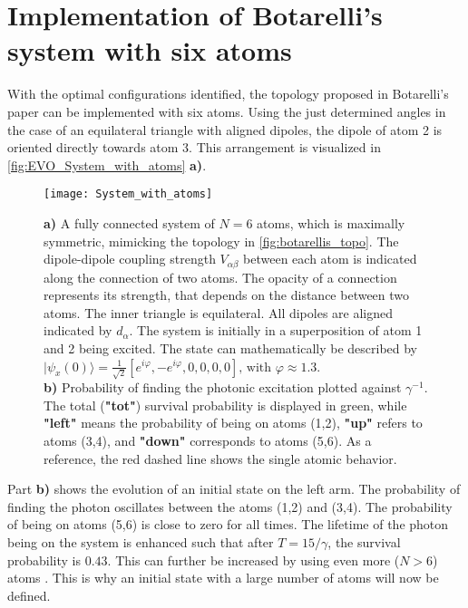 \section{Implementation of Botarelli's system with six atoms}\label{subsec:botarellis_system}
With the optimal configurations identified,
the topology
proposed in Botarelli's paper \cite{Startingpoint} can be implemented with six atoms.
Using the just determined angles in the case of an equilateral triangle with aligned dipoles, the dipole of atom 2 is oriented directly towards atom 3.
This arrangement is visualized in \autoref{fig:EVO_System_with_atoms} \textbf{a)}.

\begin{figure}[!ht]
    \centering
    \texttt{[image: System\_with\_atoms]}
    \caption{\textbf{a)} A fully connected system of $N = 6$ atoms,
        which is maximally symmetric, mimicking the topology in \autoref{fig:botarellis_topo}.
    The dipole-dipole coupling strength $ V_{\alpha \beta} $ between each atom is indicated along the connection of two atoms.
    The opacity of a connection represents its strength, that depends on the distance between two atoms.
    The inner triangle is equilateral.
    All dipoles are  aligned indicated by $d_\alpha$.
    The system is initially in a superposition of atom 1 and 2 being excited.
    The state can mathematically be described by
    $ \vert \psi_x(0)\rangle =  \frac{1}{\sqrt{2}}\left[e^{i \varphi}, -e^{i \varphi}, 0, 0, 0, 0\right] \text{, with } \varphi \approx 1.3 $.\\ %
    \textbf{b)} Probability of finding the photonic excitation plotted against $ \gamma ^{-1}$.
    The total (\textbf{"tot"}) survival probability is displayed in green, while \textbf{"left"}
    means the probability of being on atoms (1,2), \textbf{"up"} refers to atoms (3,4), and
    \textbf{"down"} corresponds to atoms (5,6).
    As a reference, the red dashed line shows the single atomic behavior.}
    \label{fig:EVO_System_with_atoms}
\end{figure}

\noindent
Part \textbf{b)} shows the evolution of an initial state on the left arm.
The probability of finding the photon oscillates between the atoms (1,2) and (3,4).
The probability of being on atoms (5,6) is close to zero for all times.
\noindent
The lifetime of the photon being on the system is enhanced such that after $ T = 15 /\gamma $, the survival probability is $ 0.43$.
This can further be increased by using even more ($ N > 6 $) atoms \cite{AsenjoGarcia2017}.
This is why an initial state with a large number of atoms will now be defined.



